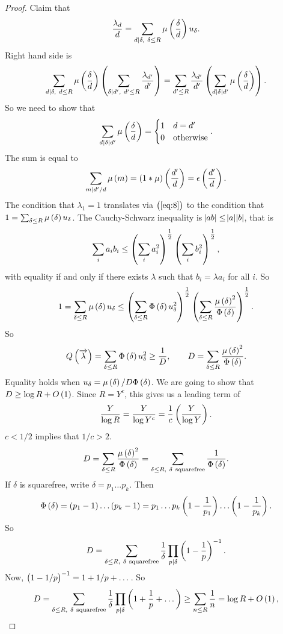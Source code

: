 \begin{proof}

Claim that
\begin{equation}
\label{eq:8}
\dfrac{\lambda_d}{d} = \sum_{d \mid \delta, \ \delta \le R} \mu\br{\dfrac{\delta}{d}}u_\delta.
\end{equation}
Right hand side is
$$ \sum_{d \mid \delta, \ d \le R} \mu\br{\dfrac{\delta}{d}}\br{\sum_{\delta \mid d', \ d' \le R} \dfrac{\lambda_{d'}}{d'}} = \sum_{d' \le R} \dfrac{\lambda_{d'}}{d'}\br{\sum_{d \mid \delta \mid d'} \mu\br{\dfrac{\delta}{d}}}. $$
So we need to show that
$$ \sum_{d \mid \delta \mid d'} \mu\br{\dfrac{\delta}{d}} =
\begin{cases}
1 & d = d' \\
0 & \text{otherwise}
\end{cases}.
$$
The sum is equal to
$$ \sum_{m \mid d' / d} \mu\br{m} = \br{1 * \mu}\br{\dfrac{d'}{d}} = \epsilon\br{\dfrac{d'}{d}}. $$
The condition that $ \lambda_1 = 1 $ translates via $ \br{\ref{eq:8}} $ to the condition that $ 1 = \sum_{\delta \le R} \mu\br{\delta}u_\delta $. The Cauchy-Schwarz inequality is $ \abs{ab} \le \abs{a}\abs{b} $, that is
$$ \sum_i a_ib_i \le \br{\sum_i a_i^2}^{\tfrac{1}{2}}\br{\sum_i b_i^2}^{\tfrac{1}{2}}, $$
with equality if and only if there exists $ \lambda $ such that $ b_i = \lambda a_i $ for all $ i $. So
$$ 1 = \sum_{\delta \le R} \mu\br{\delta}u_\delta \le \br{\sum_{\delta \le R}\Phi\br{\delta}u_\delta^2}^{\tfrac{1}{2}}\br{\sum_{\delta \le R}\dfrac{\mu\br{\delta}^2}{\Phi\br{\delta}}}^{\tfrac{1}{2}}. $$
So
$$ Q\br{\overrightarrow{\lambda}} = \sum_{\delta \le R} \Phi\br{\delta}u_\delta^2 \ge \dfrac{1}{D}, \qquad D = \sum_{\delta \le R} \dfrac{\mu\br{\delta}^2}{\Phi\br{\delta}}. $$
Equality holds when $ u_\delta = \mu\br{\delta} / D\Phi\br{\delta} $. We are going to show that $ D \ge \log R + O\br{1} $. Since $ R = Y^c $, this gives us a leading term of
$$ \dfrac{Y}{\log R} = \dfrac{Y}{\log Y^c} = \dfrac{1}{c}\br{\dfrac{Y}{\log Y}}. $$
$ c < 1 / 2 $ implies that $ 1 / c > 2 $.
$$ D = \sum_{\delta \le R} \dfrac{\mu\br{\delta}^2}{\Phi\br{\delta}} = \sum_{\delta \le R, \ \delta \ \text{squarefree}} \dfrac{1}{\Phi\br{\delta}}. $$
If $ \delta $ is squarefree, write $ \delta = p_1 \dots p_k $. Then
$$ \Phi\br{\delta} = \br{p_1 - 1} \dots \br{p_k - 1} = p_1 \dots p_k\br{1 - \dfrac{1}{p_1}} \dots \br{1 - \dfrac{1}{p_k}}. $$
So
$$ D = \sum_{\delta \le R, \ \delta \ \text{squarefree}} \dfrac{1}{\delta}\prod_{p \mid \delta} \br{1 - \dfrac{1}{p}}^{-1}. $$
Now, $ \br{1 - 1 / p}^{-1} = 1 + 1 / p + \dots $. So
$$ D = \sum_{\delta \le R, \ \delta \ \text{squarefree}} \dfrac{1}{\delta}\prod_{p \mid \delta} \br{1 + \dfrac{1}{p} + \dots} \ge \sum_{n \le R} \dfrac{1}{n} = \log R + O\br{1}, $$

\end{proof}
